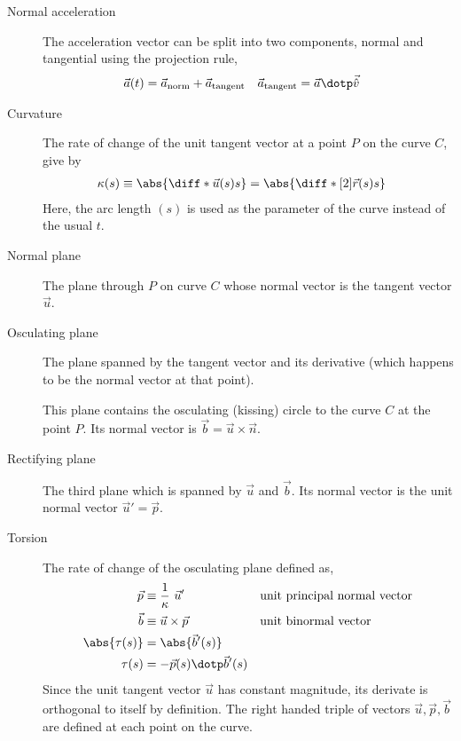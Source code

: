 \begin{description}
    \item[Normal acceleration] The acceleration vector can be split into two
          components, normal and tangential using the projection rule,
          \begin{align}
              \vec{a}(t)                 & = \vec{a}_{\text{norm}}
              + \vec{a}_{\text{tangent}} &
              \vec{a}_{\text{tangent}}   & = \vec{a} \dotp \vec{\hat{v}}
          \end{align}

    \item[Curvature] The rate of change of the unit tangent vector at a point $ P $ on
          the curve $ C $, give by
          \begin{align}
              \kappa (s) & \equiv \abs{\diff*{\vec{u}(s)}{s}}
              = \abs{\diff*[2]{\vec{r}(s)}{s}}
          \end{align}
          Here, the arc length $ (s) $ is used as the parameter of the curve instead of the
          usual $ t $.

    \item[Normal plane] The plane through $ P $ on curve $ C $ whose normal vector is
          the tangent vector $ \vec{u} $.

    \item[Osculating plane] The plane spanned by the tangent vector and its derivative
          (which happens to be the normal vector at that point). \par
          This plane contains the osculating (kissing) circle to the curve $ C $ at the
          point $ P $. Its normal vector is $ \vec{b} = \vec{u} \times \vec{n} $.

    \item[Rectifying plane] The third plane which is spanned by $ \vec{u} $ and
          $ \vec{b} $. Its normal vector is the unit normal vector $ \vec{u}' = \vec{p} $.

    \item[Torsion] The rate of change of the osculating plane defined as,
          \begin{align}
              \vec{p}       & \equiv \frac{1}{\kappa}\ \vec{u}'   &
                            & \text{unit principal normal vector}   \\
              \vec{b}       & \equiv \vec{u} \times \vec{p}       &
                            & \text{unit binormal vector}           \\
              \abs{\tau(s)} & = \abs{\vec{b}'(s)}                   \\
              \tau (s)      & = -\vec{p}(s) \dotp \vec{b}'(s)
          \end{align}
          Since the unit tangent vector $ \vec{u} $ has constant magnitude, its derivate is
          orthogonal to itself by definition. The right handed triple of vectors
          $ \vec{u}, \vec{p}, \vec{b} $ are defined at each point on the curve.
\end{description}

